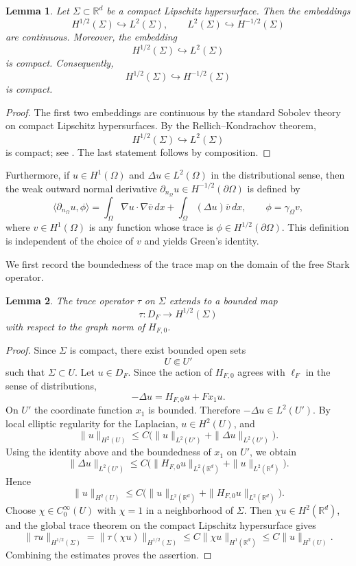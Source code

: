 \documentclass[a4paper,11pt]{article}
\numberwithin{equation}{section}
\newtheorem{lem}{Lemma}[section]
\theoremstyle{remark}
\theoremstyle{definition}
\theoremstyle{remark}
\begin{document}
\begin{lem}\label{lem:sobolev-embeddings}
Let $\Sigma\subset\mathbb R^d$ be a compact Lipschitz hypersurface.
Then the embeddings
$$
H^{1/2}(\Sigma)\hookrightarrow L^2(\Sigma),
\qquad
L^2(\Sigma)\hookrightarrow H^{-1/2}(\Sigma)
$$
are continuous.
Moreover, the embedding
$$
H^{1/2}(\Sigma)\hookrightarrow L^2(\Sigma)
$$
is compact.
Consequently,
$$
H^{1/2}(\Sigma)\hookrightarrow H^{-1/2}(\Sigma)
$$
is compact.
\end{lem}

\begin{proof}
The first two embeddings are continuous by the standard Sobolev theory on compact Lipschitz hypersurfaces.
By the Rellich--Kondrachov theorem,
$$
H^{1/2}(\Sigma)\hookrightarrow L^2(\Sigma)
$$
is compact; see \cite{AdamsFournier2003,McLean2000}.
The last statement follows by composition.
\end{proof}

Furthermore, if $u\in H^1(\Omega)$ and $\Delta u\in L^2(\Omega)$ in the distributional sense, then the weak outward normal derivative $\partial_{n_\Omega}u\in H^{-1/2}(\partial\Omega)$ is defined by
$$
\langle\partial_{n_\Omega}u,\phi\rangle
=
\int_\Omega \nabla u\cdot\nabla\overline v\,dx
+
\int_\Omega (\Delta u)\overline v\,dx,
\qquad
\phi=\gamma_\Omega v,
$$
where $v\in H^1(\Omega)$ is any function whose trace is $\phi\in H^{1/2}(\partial\Omega)$.
This definition is independent of the choice of $v$ and yields Green's identity.

We first record the boundedness of the trace map on the domain of the free Stark operator.

\begin{lem}\label{lem:trace-DF}
The trace operator $\tau$ on $\Sigma$ extends to a bounded map
$$
\tau:D_F\to H^{1/2}(\Sigma)
$$
with respect to the graph norm of $H_{F,0}$.
\end{lem}

\begin{proof}
Since $\Sigma$ is compact, there exist bounded open sets
$$
U\Subset U'
$$
such that $\Sigma\subset U$.
Let $u\in D_F$.
Since the action of $H_{F,0}$ agrees with $\ell_F$ in the sense of distributions,
$$
-\Delta u=H_{F,0}u+Fx_1u.
$$
On $U'$ the coordinate function $x_1$ is bounded.
Therefore $-\Delta u\in L^2(U')$.
By local elliptic regularity for the Laplacian, $u\in H^2(U)$, and
$$
\|u\|_{H^2(U)}
\le
C\bigl(
\|u\|_{L^2(U')}+\|\Delta u\|_{L^2(U')}
\bigr).
$$
Using the identity above and the boundedness of $x_1$ on $U'$, we obtain
$$
\|\Delta u\|_{L^2(U')}
\le
C\bigl(
\|H_{F,0}u\|_{L^2(\mathbb R^d)}
+\|u\|_{L^2(\mathbb R^d)}
\bigr).
$$
Hence
$$
\|u\|_{H^2(U)}
\le
C\bigl(
\|u\|_{L^2(\mathbb R^d)}
+\|H_{F,0}u\|_{L^2(\mathbb R^d)}
\bigr).
$$
Choose $\chi\in C_0^\infty(U)$ with $\chi=1$ in a neighborhood of $\Sigma$.
Then $\chi u\in H^2(\mathbb R^d)$, and the global trace theorem on the compact Lipschitz hypersurface gives
$$
\|\tau u\|_{H^{1/2}(\Sigma)}
=
\|\tau(\chi u)\|_{H^{1/2}(\Sigma)}
\le C\|\chi u\|_{H^1(\mathbb R^d)}
\le C\|u\|_{H^2(U)}.
$$
Combining the estimates proves the assertion.
\end{proof}
\end{document}
